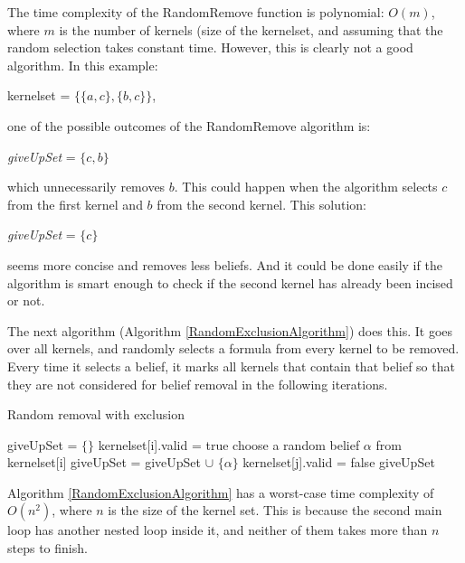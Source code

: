 The time complexity of the RandomRemove function is polynomial: $O(m)$, where $m$ is the number of kernels (size of the kernelset, and assuming that the random selection takes constant time. However, this is clearly not a good algorithm. In this example:
\begin{center}
kernelset = $\lbrace \lbrace a, c \rbrace, \lbrace b, c \rbrace \rbrace$, 
\end{center}
one of the possible outcomes of the RandomRemove algorithm is:
\begin{center}
\textit{giveUpSet} = $\lbrace c, b \rbrace$
\end{center}
which unnecessarily removes $b$. This could happen when the algorithm selects $c$ from the first kernel and $b$ from the second kernel. This solution:
\begin{center}
\textit{giveUpSet} = $\lbrace c \rbrace$
\end{center}
seems more concise and removes less beliefs. And it could be done easily if the algorithm is smart enough to check if the second kernel has already been incised or not. 

The next algorithm (Algorithm \ref{RandomExclusionAlgorithm}) does this. It goes over all kernels, and randomly selects a formula from every kernel to be removed. Every time it selects a belief, it marks all kernels that contain that belief so that they are not considered for belief removal in the following iterations. 

\begin{algorithm}
\caption{Random removal with exclusion}
\label{RandomExclusionAlgorithm}
\begin{algorithmic}[1]
\State giveUpSet = $\lbrace \rbrace$
\State kernelset[i].valid = true
\EndFor \State
{}
\State choose a random belief $\alpha$ from kernelset[i]
\State giveUpSet = giveUpSet $\cup$ $\lbrace \alpha \rbrace$
\State kernelset[j].valid = false
\EndIf
\EndFor
\EndIf
\EndFor \State
\Return giveUpSet
\EndFunction
\end{algorithmic}
\end{algorithm}

Algorithm \ref{RandomExclusionAlgorithm} has a worst-case time complexity of $O(n^2)$, where $n$ is the size of the kernel set. This is because the second main loop has another nested loop inside it, and neither of them takes more than $n$ steps to finish. 

